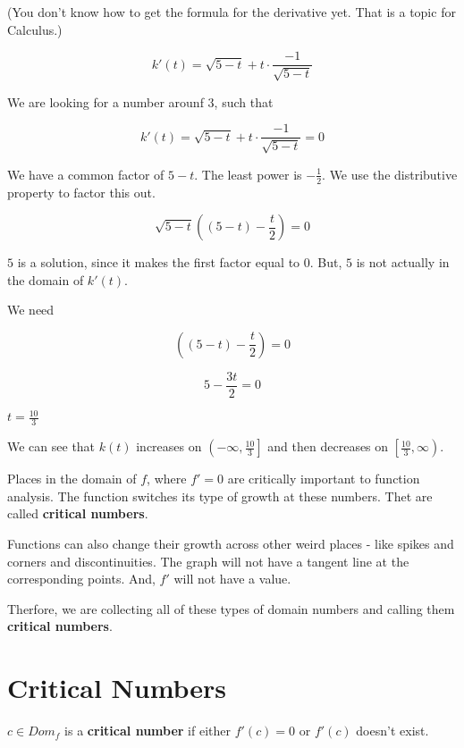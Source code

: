 \documentclass{ximera}
\begin{document}
(You don't know how to get the formula for the derivative yet.  That is a topic for Calculus.)


\[   k'(t) = \sqrt{5-t} + t \cdot \frac{-1}{\sqrt{5-t}}    \]


We are looking for a number arounf $3$, such that 


\[   k'(t) = \sqrt{5-t} + t \cdot \frac{-1}{\sqrt{5-t}}  = 0  \]

We have a common factor of $5-t$.  The least power is $-\frac{1}{2}$.  We use the distributive property to factor this out.


\[  \sqrt{5-t} \left( (5-t) - \frac{t}{2} \right) = 0  \]


$5$ is a solution, since it makes the first factor equal to $0$. But, $5$ is not actually in the domain of $k'(t)$. 

We need 


\[  \left( (5-t) - \frac{t}{2} \right) = 0  \]

\[  5 - \frac{3t}{2}  = 0  \]


$t=\frac{10}{3}$





We can see that $k(t)$ increases on $\left(-\infty, \frac{10}{3}\right]$ and then decreases on $\left[\frac{10}{3},\infty\right)$.









Places in the domain of $f$, where $f' = 0$ are critically important to function analysis. The function switches its type of growth at these numbers.  Thet are called \textbf{critical numbers}.

Functions can also change their growth across other weird places - like spikes and corners and discontinuities.  The graph will not have a tangent line at the corresponding points. And, $f'$ will not have a value.




Therfore, we are collecting all of these types of domain numbers and calling them \textbf{critical numbers}.





\section{Critical Numbers}




\begin{definition} 

$c \in Dom_f$ is a \textbf{critical number} if  either $f'(c) = 0$ or $f'(c)$ doesn't exist.


\end{definition}
\end{document}
